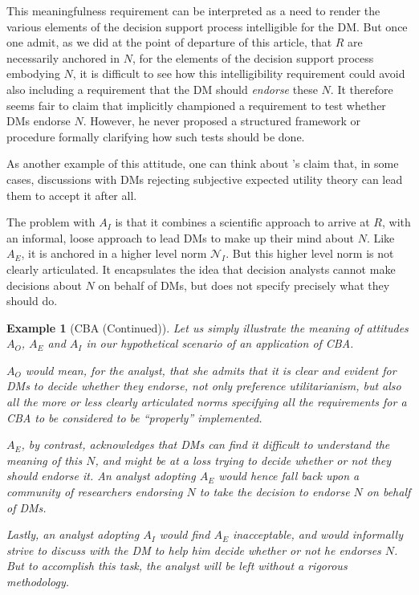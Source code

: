 \documentclass[preprint, french, english, 11pt, authoryear]{elsarticle}%
\newtheorem{example}{Example}
\begin{document}
This meaningfulness requirement can be interpreted as a need to render the various elements of the decision support process intelligible for the \ac{DM}. But once one admit, as we did at the point of departure of this article, that $R$ are necessarily anchored in $N$, for the elements of the decision support process embodying $N$, it is difficult to see how this intelligibility requirement could avoid also including a requirement that the \ac{DM} should \emph{endorse} these $N$. It therefore seems fair to claim that \citet{roy_multicriteria_1996} implicitly championed a requirement to test whether \acp{DM} endorse $N$. However, he never proposed a structured framework or procedure formally clarifying how such tests should be done.


As another example of this attitude, one can think about \citet{raiffa_back_1985}’s claim that, in some cases, discussions with \acp{DM} rejecting subjective expected utility theory can lead them to accept it after all.

The problem with $A_I$ is that it combines a scientific approach to arrive at $R$, with an informal, loose approach to lead \acp{DM} to make up their mind about $N$.
Like $A_E$, it is anchored in a higher level norm $\mathscr{N}_I$. But this higher level norm is not clearly articulated. It encapsulates the idea that decision analysts cannot make decisions about $N$ on behalf of \acp{DM}, but does not specify precisely what they should do.

\begin{example}[CBA (Continued)]
Let us simply illustrate the meaning of attitudes $A_O$, $A_E$ and $A_I$ in our hypothetical scenario of an application of CBA.

$A_O$ would mean, for the analyst, that she admits that it is clear and evident for \acp{DM} to decide whether they endorse, not only preference utilitarianism, but also all the more or less clearly articulated norms specifying all the requirements for a CBA to be considered to be ``properly'' implemented.

$A_E$, by contrast, acknowledges that \acp{DM} can find it difficult to understand the meaning of this $N$, and might be at a loss trying to decide whether or not they should endorse it. An analyst adopting $A_E$ would hence fall back upon a community of researchers endorsing $N$ to take the decision to endorse $N$ on behalf of \acp{DM}.

Lastly, an analyst adopting $A_I$ would find $A_E$ inacceptable, and would informally strive to discuss with the \ac{DM} to help him decide whether or not he endorses $N$. But to accomplish this task, the analyst will be left without a rigorous methodology.
\end{example}
\end{document}
